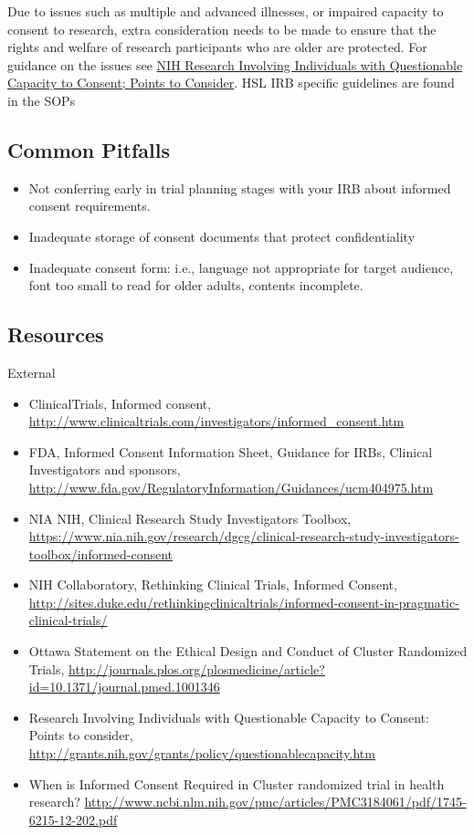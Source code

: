 \documentclass[]{book}
\theoremstyle{definition}
\theoremstyle{definition}
\theoremstyle{definition}
\theoremstyle{remark}
\begin{document}
Due to issues such as multiple and advanced illnesses, or impaired
capacity to consent to research, extra consideration needs to be made to
ensure that the rights and welfare of research participants who are
older are protected. For guidance on the issues see
\href{http://grants.nih.gov/grants/policy/questionablecapacity.htm}{NIH
Research Involving Individuals with Questionable Capacity to Consent;
Points to Consider}. HSL IRB specific guidelines are found in the SOPs

\subsection{Common Pitfalls}\label{common-pitfalls-8}

\begin{itemize}
\item
  Not conferring early in trial planning stages with your IRB about
  informed consent requirements.
\item
  Inadequate storage of consent documents that protect confidentiality
\item
  Inadequate consent form: i.e., language not appropriate for target
  audience, font too small to read for older adults, contents
  incomplete.
\end{itemize}

\subsection{Resources}\label{resources-9}

External

\begin{itemize}
\item
  ClinicalTrials, Informed consent,
  \url{http://www.clinicaltrials.com/investigators/informed_consent.htm}
\item
  FDA, Informed Consent Information Sheet, Guidance for IRBs, Clinical
  Investigators and sponsors,
  \url{http://www.fda.gov/RegulatoryInformation/Guidances/ucm404975.htm}
\item
  NIA NIH, Clinical Research Study Investigators Toolbox,
  \url{https://www.nia.nih.gov/research/dgcg/clinical-research-study-investigators-toolbox/informed-consent}
\item
  NIH Collaboratory, Rethinking Clinical Trials, Informed Consent,
  \url{http://sites.duke.edu/rethinkingclinicaltrials/informed-consent-in-pragmatic-clinical-trials/}
\item
  Ottawa Statement on the Ethical Design and Conduct of Cluster
  Randomized Trials,
  \url{http://journals.plos.org/plosmedicine/article?id=10.1371/journal.pmed.1001346}
\item
  Research Involving Individuals with Questionable Capacity to Consent:
  Points to consider,
  \url{http://grants.nih.gov/grants/policy/questionablecapacity.htm}
\item
  When is Informed Consent Required in Cluster randomized trial in
  health research?
  \url{http://www.ncbi.nlm.nih.gov/pmc/articles/PMC3184061/pdf/1745-6215-12-202.pdf}
\end{itemize}
\end{document}
